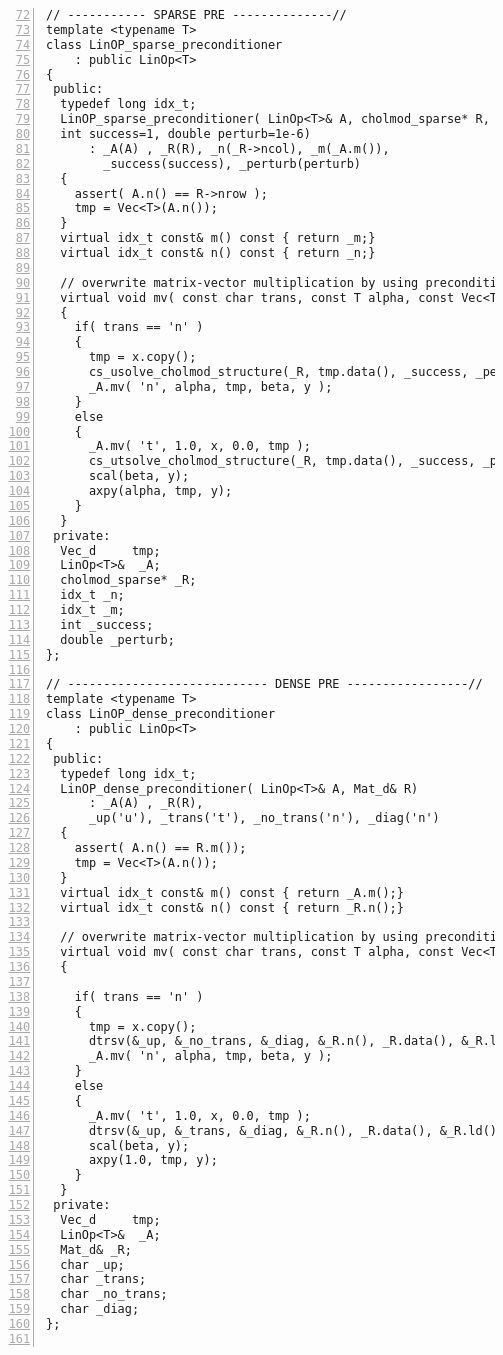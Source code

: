 \documentclass[english,11pt]{article}
\begin{document}
\begin{lstlisting}[numbers=left, firstnumber = 72]
// ----------- SPARSE PRE --------------//
template <typename T>
class LinOP_sparse_preconditioner
    : public LinOp<T>
{
 public:
  typedef long idx_t;
  LinOP_sparse_preconditioner( LinOp<T>& A, cholmod_sparse* R, 
  int success=1, double perturb=1e-6)
      : _A(A) , _R(R), _n(_R->ncol), _m(_A.m()), 
        _success(success), _perturb(perturb)
  {
    assert( A.n() == R->nrow );
    tmp = Vec<T>(A.n());
  }
  virtual idx_t const& m() const { return _m;}
  virtual idx_t const& n() const { return _n;}
  
  // overwrite matrix-vector multiplication by using preconditioner               
  virtual void mv( const char trans, const T alpha, const Vec<T> x, const T beta, Vec<T> y )
  {
    if( trans == 'n' )
    {
      tmp = x.copy();
      cs_usolve_cholmod_structure(_R, tmp.data(), _success, _perturb);
      _A.mv( 'n', alpha, tmp, beta, y );
    }
    else
    {
      _A.mv( 't', 1.0, x, 0.0, tmp );
      cs_utsolve_cholmod_structure(_R, tmp.data(), _success, _perturb);
      scal(beta, y);
      axpy(alpha, tmp, y);
    }
  }                
 private:
  Vec_d     tmp;
  LinOp<T>&  _A;
  cholmod_sparse* _R;
  idx_t _n;
  idx_t _m;
  int _success;
  double _perturb;
};

// ---------------------------- DENSE PRE -----------------//
template <typename T>
class LinOP_dense_preconditioner
    : public LinOp<T>
{
 public:
  typedef long idx_t;
  LinOP_dense_preconditioner( LinOp<T>& A, Mat_d& R)
      : _A(A) , _R(R), 
      _up('u'), _trans('t'), _no_trans('n'), _diag('n')
  {
    assert( A.n() == R.m());
    tmp = Vec<T>(A.n());
  }
  virtual idx_t const& m() const { return _A.m();}
  virtual idx_t const& n() const { return _R.n();}
  
  // overwrite matrix-vector multiplication by using preconditioner               
  virtual void mv( const char trans, const T alpha, const Vec<T> x, const T beta, Vec<T> y )
  {

    if( trans == 'n' )
    {
      tmp = x.copy();
      dtrsv(&_up, &_no_trans, &_diag, &_R.n(), _R.data(), &_R.ld(), tmp.data(), &tmp.inc());
      _A.mv( 'n', alpha, tmp, beta, y );
    }
    else
    {
      _A.mv( 't', 1.0, x, 0.0, tmp );
      dtrsv(&_up, &_trans, &_diag, &_R.n(), _R.data(), &_R.ld(), tmp.data(), &tmp.inc());
      scal(beta, y);
      axpy(1.0, tmp, y);
    }
  }                
 private:
  Vec_d     tmp;
  LinOp<T>&  _A;
  Mat_d& _R;
  char _up;
  char _trans; 
  char _no_trans; 
  char _diag;
};


\end{lstlisting}
\end{document}
